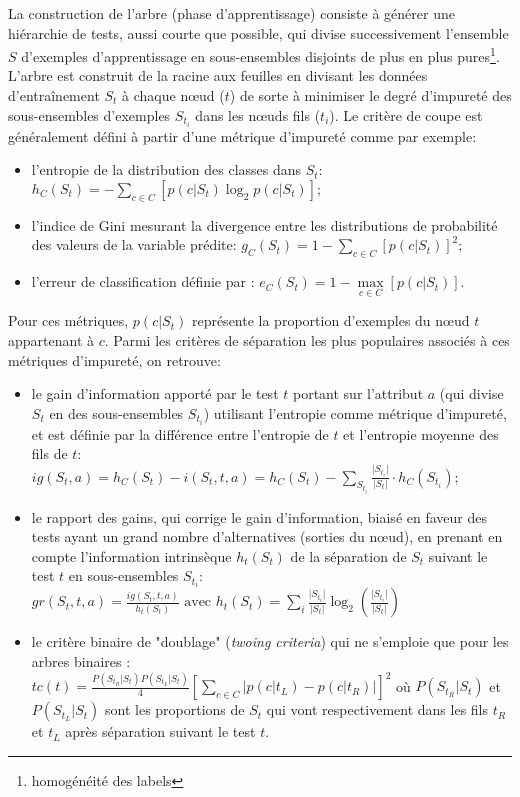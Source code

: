 La construction de l'arbre (phase d'apprentissage) consiste à générer une hiérarchie de tests, aussi courte que possible, qui divise successivement l'ensemble $S$ d'exemples d'apprentissage en sous-ensembles disjoints de plus en plus pures\footnote{homogénéité des labels}. %
L'arbre est construit de la racine aux feuilles en divisant les données d'entraînement $S_{t}$ à chaque nœud ($t$) de sorte à minimiser le degré d'impureté des sous-ensembles d'exemples  $S_{t_i}$ dans les n\oe{}uds fils ($t_i$). Le critère de coupe est généralement défini à partir d'une métrique d'impureté comme par exemple:
\begin{itemize}
	\item l'entropie de la distribution des classes dans $S_t$: \\ $h_C(S_t) = - \sum\limits_{c \in C} \left[p(c \vert S_t) \log_2 p(c \vert S_t)\right];$
	\item l'indice de Gini mesurant la divergence entre les distributions de probabilité des valeurs de la variable prédite: $g_C(S_t) = 1 - \sum\limits_{c \in C} \left[p(c \vert S_t)\right]^2;$
	\item l'erreur de classification définie par : $e_C(S_t) = 1 - \max\limits_{c \in C} \left[p(c \vert S_t)\right]$. 
\end{itemize}
Pour ces métriques, $p(c \vert S_t)$ représente la proportion d'exemples du n\oe{}ud $t$ appartenant à $c$. Parmi les critères de séparation les plus populaires associés à ces métriques d'impureté, on retrouve: 

\begin{itemize}
	\item le gain d'information apporté par le test $t$ portant sur l'attribut $a$ (qui divise $S_t$ en des sous-ensembles $S_{t_i}$) utilisant l'entropie comme métrique d'impureté, et est définie par la différence entre l'entropie de $t$ et l'entropie moyenne des fils de $t$: \\ $ig(S_t, a) = h_C(S_t) - i(S_t, t, a) =  h_C(S_t) - \sum\limits_{S_{t_i}} \frac{\vert S_{t_i} \vert}{\vert S_{t} \vert} \cdot h_C(S_{t_i});$
	\item le rapport des gains, qui corrige le gain d'information, biaisé en faveur des tests ayant un grand nombre d'alternatives (sorties du nœud), en prenant en compte l'information intrinsèque $h_t(S_t)$ de la séparation de $S_t$ suivant le test $t$ en sous-ensembles $S_{t_i}$: \\$gr(S_t, t, a) = \frac{ig(S_t, t, a)}{h_t(S_t)} \text{ avec } h_t(S_t) = \sum\limits_i \frac{\vert S_{t_i}\vert}{\vert S_t \vert} \log_2 \left(\frac{\vert S_{t_i}\vert}{\vert S_t \vert}\right)$
	\item le critère binaire de "doublage" (\textit{twoing criteria}) qui ne s'emploie que pour les arbres binaires : \\ $tc(t) = \frac{P(S_{t_R} \vert S_t)P(S_{t_L} \vert S_t)}{4} \left[\sum\limits_{c \in C} \vert p(c \vert t_L) - p(c \vert t_R)\vert\right]^2$ où  $P(S_{t_R} \vert S_t)$ et $P(S_{t_L} \vert S_t)$ sont les proportions de $S_t$ qui vont respectivement dans les fils $t_R$ et $t_L$ après séparation suivant le test $t$.
\end{itemize}

